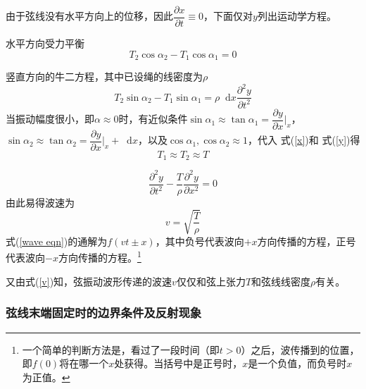 \documentclass[a4paper,11pt]{article}
\newcommand*{\dif}{\mathop{}\!\mathrm{d}}
\begin{document}
            由于弦线没有水平方向上的位移，因此$\dfrac{\partial x}{\partial t} \equiv 0$，下面仅对$y$列出运动学方程。

            水平方向受力平衡
            \begin{equation}
                T_2\cos\alpha_2 - T_1\cos\alpha_1 = 0
                \label{x}
            \end{equation}

            竖直方向的牛二方程，其中已设绳的线密度为$\rho$
            \begin{equation}
                T_2\sin\alpha_2 - T_1\sin\alpha_1 = \rho\dif x \frac{\partial^2 y}{\partial t ^2}
                \label{y}
            \end{equation}
            当振动幅度很小，即$\alpha \approx 0$时，有近似条件$\sin\alpha_1 \approx \tan \alpha_1 = \dfrac{\partial y}{\partial x}\bigg|_x $，$\sin\alpha_2 \approx \tan \alpha_2 = \dfrac{\partial y}{\partial x}\bigg|_x +\dif x$，以及$\cos\alpha_1,\cos\alpha_2 \approx 1$，代入 式(\ref{x})和 式(\ref{y})得
            \begin{equation}
                T_1 \approx T_2 \approx T
            \end{equation}

            \begin{equation}
                \dfrac{\partial^2y}{\partial t^2} - \dfrac{T}{\rho} \dfrac{\partial^2y}{\partial x^2} = 0 
                \label{wave eqn}
            \end{equation}
            由此易得波速为
            \begin{equation}
                v = \sqrt{\dfrac{T}{\rho}}
                \label{v}
            \end{equation}
            式(\ref{wave eqn})的通解为$f(vt \pm x)$，其中负号代表波向$+x$方向传播的方程，正号代表波向$-x$方向传播的方程。\footnote{一个简单的判断方法是，看过了一段时间（即$t>0$）之后，波传播到的位置，即$f(0)$将在哪一个$x$处获得。当括号中是正号时，$x$是一个负值，而负号时$x$为正值。}

            又由式(\ref{v})知，弦振动波形传递的波速$v$仅仅和弦上张力$T$和弦线线密度$\rho$有关。
        
        \subsubsection{弦线末端固定时的边界条件及反射现象}
\end{document}
